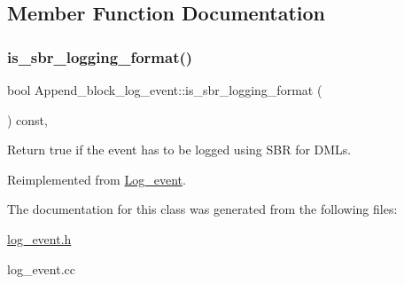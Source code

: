 \subsection{Member Function Documentation}
\mbox{\label{classAppend__block__log__event_a6f758b2da7126c0a881bcc901f481472}} 
\subsubsection{\texorpdfstring{is\+\_\+sbr\+\_\+logging\+\_\+format()}{is\_sbr\_logging\_format()}}
{\footnotesize\ttfamily bool Append\+\_\+block\+\_\+log\+\_\+event\+::is\+\_\+sbr\+\_\+logging\+\_\+format (\begin{DoxyParamCaption}{ }\end{DoxyParamCaption}) const\hspace{0.3cm}{\ttfamily [inline]}, {\ttfamily [virtual]}}

Return true if the event has to be logged using S\+BR for D\+M\+Ls. 

Reimplemented from \mbox{\hyperlink{classLog__event_ad4d689d007b7c8f1b0d54e65d8f34069}{Log\+\_\+event}}.



The documentation for this class was generated from the following files\+:\begin{DoxyCompactItemize}
\item 
\mbox{\hyperlink{log__event_8h}{log\+\_\+event.\+h}}\item 
log\+\_\+event.\+cc\end{DoxyCompactItemize}
